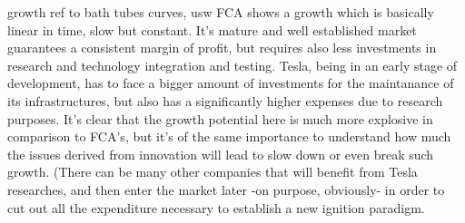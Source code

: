 growth
    {ref to bath tubes curves, usw} FCA shows a growth which is basically linear in time, slow but constant. It's mature and well established market guarantees a consistent margin of profit, but requires also less investments in research and technology integration and testing. Tesla, being in an early stage of development, has to face a bigger amount of investments for the maintanance of its infrastructures, but also has a significantly higher expenses due to research purposes. It's clear that the growth potential here is much more explosive in comparison to FCA's, but it's of the same importance to understand how much the issues derived from innovation will lead to slow down or even break such growth. (There can be many other companies that will benefit from Tesla researches, and then enter the market later -on purpose, obviously- in order to cut out all the expenditure necessary to establish a new ignition paradigm. 




